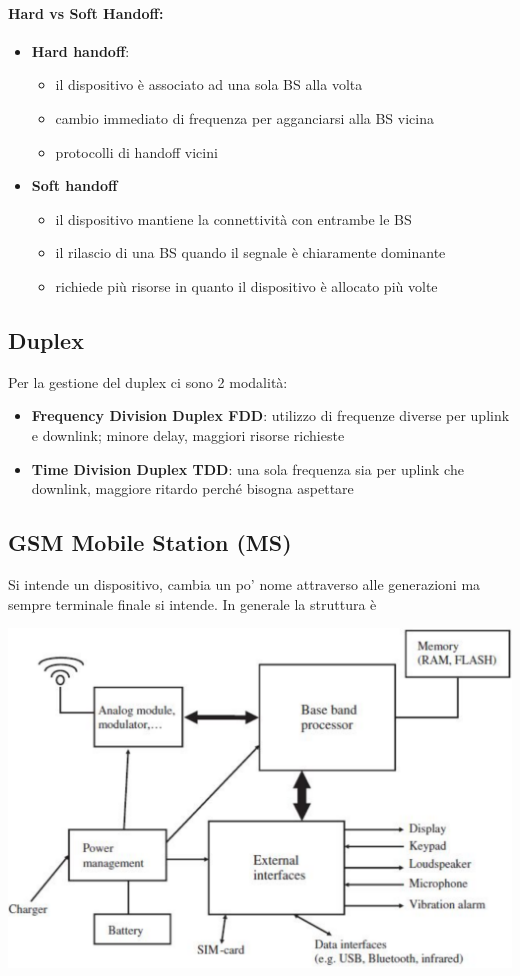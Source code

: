 \paragraph{Hard vs Soft Handoff:}
\begin{itemize}
	\item \textbf{Hard handoff}:
	\begin{itemize}
		\item il dispositivo è associato ad una sola BS alla volta
		\item cambio immediato di frequenza per agganciarsi alla BS vicina
		\item protocolli di handoff vicini
	\end{itemize}
	
	\item \textbf{Soft handoff}
	\begin{itemize}
		\item il dispositivo mantiene la connettività con entrambe le BS
		\item il rilascio di una BS quando il segnale è chiaramente dominante
		\item richiede più risorse in quanto il dispositivo è allocato più volte
	\end{itemize}
\end{itemize}

\newpage

\subsection{Duplex}
Per la gestione del duplex ci sono 2 modalità:
\begin{itemize}
	\item \textbf{Frequency Division Duplex FDD}: utilizzo di frequenze diverse per uplink e downlink; minore delay, maggiori risorse richieste
	\item \textbf{Time Division Duplex TDD}: una sola frequenza sia per uplink che downlink, maggiore ritardo perché bisogna aspettare
\end{itemize}

\subsection{GSM Mobile Station (MS)}

Si intende un dispositivo, cambia un po' nome attraverso alle generazioni ma sempre terminale finale si intende. In generale la struttura è
\begin{center}
	\includegraphics[width=0.65\linewidth]{img/mobile/ms1}
\end{center}


